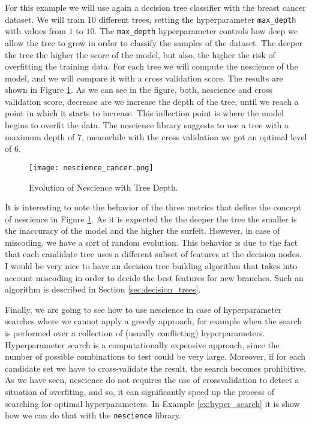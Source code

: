 \begin{example}
\label{ex:nescence_hyperparameter}

For this example we will use again a decision tree classifier with the breast cancer dataset. We will train $10$ different trees, setting the hyperparameter \texttt{max\_depth} with values from $1$ to $10$. The \texttt{max\_depth} hyperparameter controls how deep we allow the tree to grow in order to classify the samples of the dataset. The deeper the tree the higher the score of the model, but also, the higher the risk of overfitting the training data. For each tree we will compute the nescience of the model, and we will compare it with a cross validation score. The results are shown in Figure \ref{figure:nescience_cancer}. As we can see in the figure, both, nescience and cross validation score, decrease are we increase the depth of the tree, until we reach a point in which it starts to increase. This inflection point is where the model begins to overfit the data. The nescience library suggests to use a tree with a maximum depth of $7$, meanwhile with the cross validation we got an optimal level of 6.

\begin{figure}[h]
\centering
\texttt{[image: nescience\_cancer.png]}
\caption{Evolution of Nescience with Tree Depth.}
\label{figure:nescience_cancer}
\end{figure}

\end{example}

It is interesting to note the behavior of the three metrics that define the concept of nescience in Figure \ref{figure:nescience_cancer}. As it is expected the the deeper the tree the smaller is the inaccuracy of the model and the higher the surfeit. However, in case of miscoding, we have a sort of random evolution. This behavior is due to the fact that each candidate tree uses a different subset of features at the decision nodes. I would be very nice to have an decision tree building algorithm that takes into account miscoding in order to decide the best features for new branches. Such an algorithm is described in Section \ref{sec:decision_trees}.

Finally, we are going to see how to use nescience in case of hyperparameter searches where we cannot apply a greedy approach, for example when the search is performed over a collection of (usually conflicting) hyperparameters. Hyperparameter search is a computationally expensive approach, since the number of possible combinations to test could be very large. Moreover, if for each candidate set we have to cross-validate the result, the search becomes prohibitive. As we have seen, nescience do not requires the use of crossvalidation to detect a situation of overfiting, and so, it can significantly speed up the process of searching for optimal hyperparameters. In Example \ref{ex:hyper_search} it is show how we can do that with the \texttt{nescience} library.

